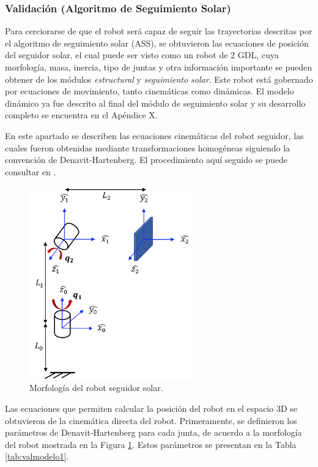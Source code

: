 \subsubsection{Validación (Algoritmo de Seguimiento Solar)}
Para cerciorarse de que el robot será capaz de seguir las trayectorias descritas por el algoritmo de seguimiento solar (ASS), se obtuvieron las ecuaciones de posición del seguidor solar, el cual puede ser visto como un robot de 2 GDL, cuya morfología, masa, inercia, tipo de juntas y otra información importante se pueden obtener de los módulos \textit{estructural} y \textit{seguimiento solar}. Este robot está gobernado por ecuaciones de movimiento, tanto cinemáticas como dinámicas. El modelo dinámico ya fue descrito al final del módulo de seguimiento solar y su desarrollo completo se encuentra en el Apéndice X.

En este apartado se describen las ecuaciones cinemáticas del robot seguidor, las cuales fueron obtenidas mediante transformaciones homogéneas siguiendo la convención de Denavit-Hartenberg. El procedimiento aquí seguido se puede consultar en \cite{DDA11}.

\begin{figure}[H]
	\centering
	\includegraphics[width=7cm]{imagenes/valmodelo1}
	\caption{Morfología del robot seguidor solar.}
	\label{fig:valmodelo1}
\end{figure}

Las ecuaciones que permiten calcular la posición del robot en el espacio 3D se obtuvieron de la cinemática directa del robot. Primeramente, se definieron los parámetros de Denavit-Hartenberg para cada junta, de acuerdo a la morfología del robot mostrada en la Figura \ref{fig:valmodelo1}. Estos parámetros se presentan en la Tabla \ref{tab:valmodelo1}.

